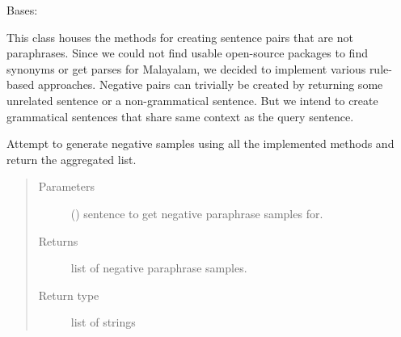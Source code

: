 \documentclass[letterpaper,10pt,english]{sphinxmanual}
\begin{document}
\begin{fulllineitems}
\label{\detokenize{ParaphraseDatasetCreation.Malayalam:ParaphraseDatasetCreation.Malayalam.Negative.NegativeParaphrases}}
Bases: 

This class houses the methods for creating sentence pairs that are not 
paraphrases. Since we could not find usable open-source packages to find 
synonyms or get parses for Malayalam, we decided to implement various
rule-based approaches. Negative pairs can trivially be created by returning
some unrelated sentence or a non-grammatical sentence. But we intend to 
create grammatical sentences that share same context as the query sentence.

\begin{fulllineitems}
\label{\detokenize{ParaphraseDatasetCreation.Malayalam:ParaphraseDatasetCreation.Malayalam.Negative.NegativeParaphrases.generate}}
Attempt to generate negative samples using all the implemented methods
and return the aggregated list.
\begin{quote}\begin{description}
\item[{Parameters}] \leavevmode
{} () \textendash{} sentence to get negative paraphrase samples for.

\item[{Returns}] \leavevmode
list of negative paraphrase samples.

\item[{Return type}] \leavevmode
list of strings

\end{description}\end{quote}

\end{fulllineitems}



\end{fulllineitems}
\end{document}

